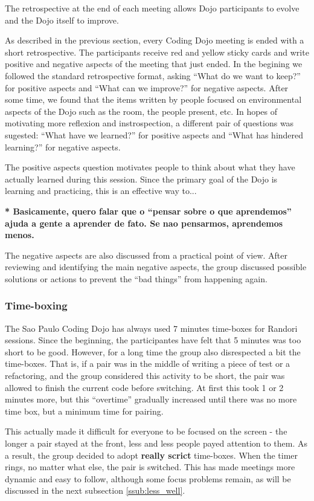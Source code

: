 The retrospective at the end of each meeting allows Dojo participants
to evolve and the Dojo itself to improve.

As described in the previous section, every Coding Dojo meeting is
ended with a short retrospective. The participants receive red and
yellow sticky cards and write positive and negative aspects of the
meeting that just ended. In the begining we followed the standard
retrospective format, asking ``What do we want to keep?''  for
positive aspects and ``What can we improve?'' for negative
aspects. After some time, we found that the items written by people
focused on environmental aspects of the Dojo such as the room, the
people present, etc. In hopes of motivating more reflexion and
instrospection, a different pair of questions was sugested: ``What
have we learned?'' for positive aspects and ``What has hindered
learning?'' for negative aspects.

The positive aspects question motivates people to think about what
they have actually learned during this session. Since the primary goal
of the Dojo is learning and practicing, this is an effective way to...

{\bf** Basicamente, quero falar que o ``pensar sobre o que aprendemos''
ajuda a gente a aprender de fato. Se nao pensarmos, aprendemos menos.}

The negative aspects are also discussed from a practical point of
view. After reviewing and identifying the main negative aspects, the
group discussed possible solutions or actions to prevent the ``bad
things'' from happening again.

\subsubsection{Time-boxing}

The Sao Paulo Coding Dojo has always used 7 minutes time-boxes for
Randori sessions. Since the beginning, the participantes have felt
that 5 minutes was too short to be good. However, for a long time the
group also disrespected a bit the time-boxes. That is, if a pair was
in the middle of writing a piece of test or a refactoring, and the
group considered this activity to be short, the pair was allowed to
finish the current code before switching. At first this took 1 or 2
minutes more, but this ``overtime'' gradually increased until there
was no more time box, but a minimum time for pairing.

This actually made it difficult for everyone to be focused on the
screen - the longer a pair stayed at the front, less and less people
payed attention to them. As a result, the group decided to adopt
\textbf{really scrict} time-boxes. When the timer rings, no matter
what else, the pair is switched. This has made meetings more dynamic
and easy to follow, although some focus problems remain, as will be
discussed in the next subsection \ref{ssub:less_well}.

